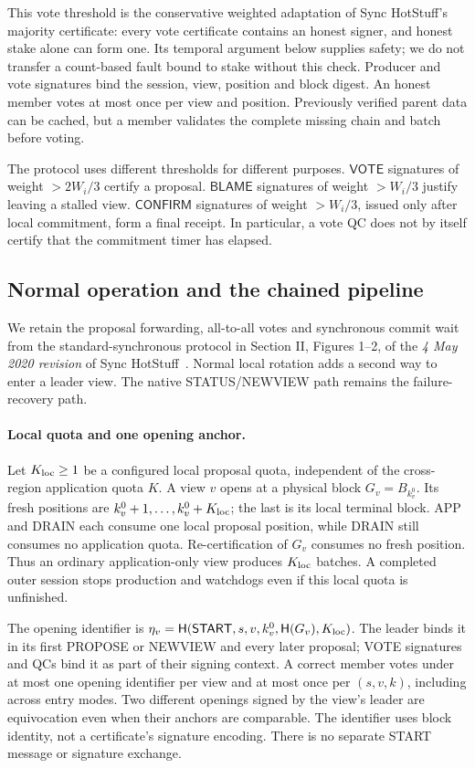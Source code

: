 \documentclass[11pt,a4paper,onecolumn]{article}
\newcommand{\Hash}{\mathsf H}
\newcommand{\Tag}[1]{\ensuremath{\mathsf{#1}}}
\newcounter{protocol}
\begin{document}
This vote threshold is the conservative weighted adaptation of Sync HotStuff's
majority certificate: every vote certificate contains an honest signer, and honest
stake alone can form one. Its temporal argument below supplies safety;
we do not transfer a count-based fault bound to stake without this check.
Producer and vote signatures bind the session, view, position and block
digest. An honest member votes at most once per view and position.
Previously verified parent data can be cached, but a member validates the
complete missing chain and batch before voting.

The protocol uses different thresholds for different purposes.
\Tag{VOTE} signatures of weight $>2W_i/3$ certify a proposal.
\Tag{BLAME} signatures of weight $>W_i/3$ justify leaving a stalled view.
\Tag{CONFIRM} signatures of weight $>W_i/3$, issued only after local
commitment, form a final receipt. In particular, a vote QC does not by
itself certify that the commitment timer has elapsed.

\subsection{Normal operation and the chained pipeline}
We retain the proposal forwarding, all-to-all votes and synchronous commit
wait from the standard-synchronous protocol in Section II, Figures 1--2,
of the \emph{4 May 2020 revision} of Sync HotStuff~\cite{synchotstuff}.
Normal local rotation adds a second way to enter a leader view. The native
STATUS/NEWVIEW path remains the failure-recovery path.

\paragraph{Local quota and one opening anchor.}
Let $K_{\rm loc}\geq1$ be a configured local proposal quota, independent of
the cross-region application quota $K$. A view $v$ opens at a physical block
$G_v=B_{k_v^0}$. Its fresh positions are $k_v^0+1,\ldots,k_v^0+K_{\rm loc}$;
the last is its local terminal block. APP and DRAIN each consume one local
proposal position, while DRAIN still consumes no application quota.
Re-certification of $G_v$ consumes no fresh position. Thus an ordinary
application-only view produces $K_{\rm loc}$ batches. A completed outer
session stops production and watchdogs even if this local quota is unfinished.

The opening identifier is
$\eta_v=\Hash(\Tag{START},s,v,k_v^0,\Hash(G_v),K_{\rm loc})$.
The leader binds it in its first PROPOSE or NEWVIEW and every later proposal;
VOTE signatures and QCs bind it as part of their signing context. A correct
member votes under at most one opening identifier per view and at most once
per $(s,v,k)$, including across entry modes. Two different openings signed
by the view's leader are equivocation even when their anchors are comparable.
The identifier uses block identity, not a certificate's signature encoding.
There is no separate START message or signature exchange.
\end{document}
